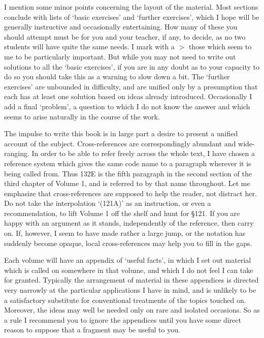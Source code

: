 I mention some minor points concerning the layout of the material.
Most sections conclude with lists of `basic exercises' and
`further exercises', which I hope will be generally instructive and
occasionally entertaining.   How many of these you should attempt must
be for you and your teacher, if any, to decide, as no two students will
have quite the same needs.   I mark with a $\pmb{>}$ those which seem to
me to be particularly important.   But while you may not need to write
out solutions to all the `basic exercises', if you are in any doubt
as to your capacity to do so you should take this as a warning to slow
down a bit.   The `further exercises' are unbounded in difficulty,
and are unified only by a presumption that each has at least one
solution based
on ideas already introduced.   Occasionally I add a final `problem',
a question to which I do not know the answer and which seems to arise
naturally in the course of the work.
     
The impulse to write this book is in large part a desire to present a
unified account of the subject.   Cross-references are correspondingly
abundant and wide-ranging.  In order to be able to refer freely across
the whole
text, I have chosen a reference system which gives the same code name to
a paragraph wherever it is being called from.   Thus 132E is the fifth
paragraph in the second section of the
third chapter of Volume 1, and is referred to by that name throughout.
Let me emphasize that cross-references are supposed to help the reader,
not distract her.   Do not take the interpolation `(121A)' as an
instruction, or even a recommendation, to lift Volume 1 off the shelf
and hunt for \S121.   If you are happy with an argument as it stands,
independently of the reference, then carry on.   If, however, I seem to
have made rather a large jump, or the notation has suddenly become
opaque, local cross-references may help you to fill in the gaps.
     
Each volume will have an appendix of `useful facts', in which I set
out material which is called on somewhere in that volume, and which I do
not feel I can take for granted.   Typically the arrangement of material
in these appendices is directed very narrowly at the particular
applications I have in mind, and is unlikely to be a satisfactory
substitute for conventional treatments of the topics touched on.
Moreover, the ideas may well be needed only on rare and isolated
occasions.   So as a rule I
recommend you to ignore the appendices until you have some
direct reason to suppose that a fragment may be useful to you.
     
